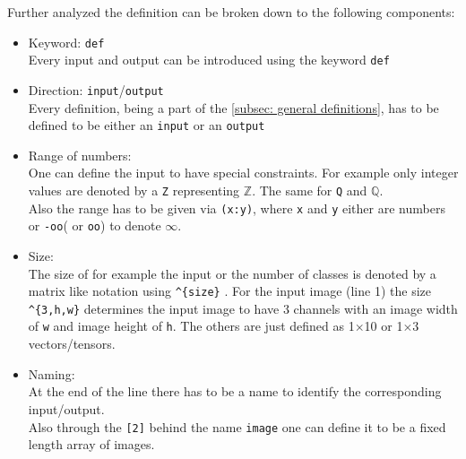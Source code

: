 Further analyzed the definition can be broken down to the following components:
\begin{itemize}
	\item Keyword: \texttt{def}\\
	Every input and output can be introduced using the keyword \texttt{def}
	\item Direction: \texttt{input}/\texttt{output}\\
	Every definition, being a part of the \ref{subsec: general definitions}, has to be defined to be either an \texttt{input} or an \texttt{output}
	\item Range of numbers:\\
	One can define the input to have special constraints. For example only integer values are denoted by a \texttt{Z} representing $\mathbb{Z}$. The same for \texttt{Q} and $\mathbb{Q}$. \\
	Also the range has to be given via \texttt{(x:y)}, where \texttt{x} and \texttt{y} either are numbers or \texttt{-oo}( or \texttt{oo}) to denote $\infty$.
	\item Size:\\
	The size of for example the input or the number of classes is denoted by a matrix like notation using \texttt{\^{}\{size\}}  . For the input image (line 1) the size \texttt{\^{}\{3,h,w\}} determines the input image to have 3 channels with an image width of \texttt{w} and image height of \texttt{h}.
	The others are just defined as 1$\times$10 or 1$\times$3 vectors/tensors.
	\item Naming:\\
	At the end of the line there has to be a name to identify the corresponding input/output.\\
	Also through the \texttt{[2]} behind the name \texttt{image} one can define it to be a fixed length array of images.
\end{itemize}



